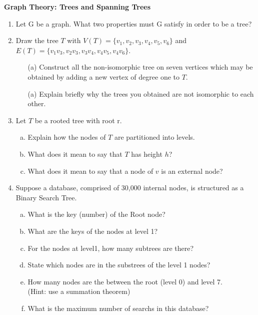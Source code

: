 \documentclass[]{article}
\begin{document}
\large
\noindent \textbf{Graph Theory: Trees and Spanning Trees}
\begin{enumerate}


\item Let G be a graph. What two properties must G satisfy in order to be a tree?




\item Draw the tree $T$ with $V(T) = \{v_1,v_2,v_3,v_4,v_5,v_6\}$ and $E(T)= \{v_1v_3, v_2v_3, v_3v_4,v_4v_5,v_4v_6\}$.


\begin{itemize}
    \item[(a)] Construct all the non-isomorphic tree on seven vertices which may be obtained by adding a new vertex of degree one to $T$.



\item[(a)] Explain briefly why the trees you obtained are not isomorphic to each other.
\end{itemize}



\item 
Let $T$ be a rooted tree with root r. 

\begin{enumerate}[(a)]
\item Explain how the nodes of $T$ are partitioned into levels.
\item What does it mean to say that $T$ has height $h$?
\item What does it mean to say that a node of $v$ is an external node?
\end{enumerate}
\item
Suppose a database, comprised of 30,000 internal nodes, is structured as a Binary Search Tree.

\begin{enumerate}[(a)]
\item What is the key (number) of the Root node?
\item What are the keys of the nodes at level 1?
\item For the nodes at level1, how many subtrees are there?
\item State which nodes are in the substrees of the level 1 nodes?
\item How many nodes are the between the root (level 0) and level 7. \\
(Hint: use a summation theorem)
\item What is the maximum number of searchs in this database?
\end{enumerate}


\end{enumerate}
\end{document}
